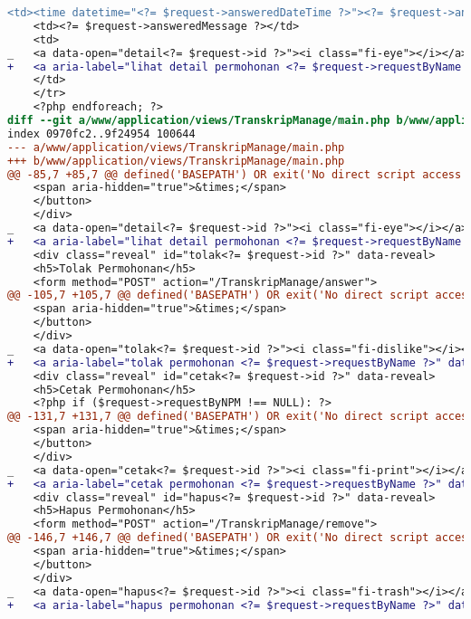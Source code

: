 \begin{lstlisting}[frame=single, label={lst:perbaikan_2.4.4_tautan_tanpa_keterangan}, language=diff, caption=Perbaikan Kriteria Sukses 2.4.4]
    <td><time datetime="<?= $request->answeredDateTime ?>"><?= $request->answeredDateString ?></time></td>
    <td><?= $request->answeredMessage ?></td>
    <td>
_   <a data-open="detail<?= $request->id ?>"><i class="fi-eye"></i></a>
+   <a aria-label="lihat detail permohonan <?= $request->requestByName ?>" data-open="detail<?= $request->id ?>"><i class="fi-eye"></i></a>
    </td>
    </tr>
    <?php endforeach; ?>
diff --git a/www/application/views/TranskripManage/main.php b/www/application/views/TranskripManage/main.php
index 0970fc2..9f24954 100644
--- a/www/application/views/TranskripManage/main.php
+++ b/www/application/views/TranskripManage/main.php
@@ -85,7 +85,7 @@ defined('BASEPATH') OR exit('No direct script access allowed');
    <span aria-hidden="true">&times;</span>
    </button>                                        
    </div>
_   <a data-open="detail<?= $request->id ?>"><i class="fi-eye"></i></a>
+   <a aria-label="lihat detail permohonan <?= $request->requestByName ?>" data-open="detail<?= $request->id ?>"><i class="fi-eye"></i></a>
    <div class="reveal" id="tolak<?= $request->id ?>" data-reveal>
    <h5>Tolak Permohonan</h5>
    <form method="POST" action="/TranskripManage/answer">
@@ -105,7 +105,7 @@ defined('BASEPATH') OR exit('No direct script access allowed');
    <span aria-hidden="true">&times;</span>
    </button>
    </div>
_   <a data-open="tolak<?= $request->id ?>"><i class="fi-dislike"></i></a>
+   <a aria-label="tolak permohonan <?= $request->requestByName ?>" data-open="tolak<?= $request->id ?>"><i class="fi-dislike"></i></a>
    <div class="reveal" id="cetak<?= $request->id ?>" data-reveal>
    <h5>Cetak Permohonan</h5>
    <?php if ($request->requestByNPM !== NULL): ?>
@@ -131,7 +131,7 @@ defined('BASEPATH') OR exit('No direct script access allowed');
    <span aria-hidden="true">&times;</span>
    </button>
    </div>
_   <a data-open="cetak<?= $request->id ?>"><i class="fi-print"></i></a>
+   <a aria-label="cetak permohonan <?= $request->requestByName ?>" data-open="cetak<?= $request->id ?>"><i class="fi-print"></i></a>
    <div class="reveal" id="hapus<?= $request->id ?>" data-reveal>
    <h5>Hapus Permohonan</h5>
    <form method="POST" action="/TranskripManage/remove">
@@ -146,7 +146,7 @@ defined('BASEPATH') OR exit('No direct script access allowed');
    <span aria-hidden="true">&times;</span>
    </button>
    </div>
_   <a data-open="hapus<?= $request->id ?>"><i class="fi-trash"></i></a>
+   <a aria-label="hapus permohonan <?= $request->requestByName ?>" data-open="hapus<?= $request->id ?>"><i class="fi-trash"></i></a>

\end{lstlisting}
